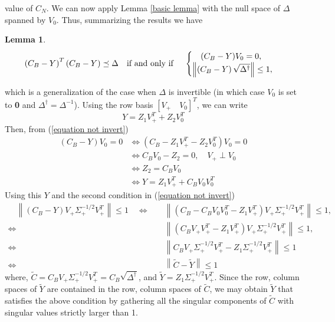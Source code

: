 \documentclass[11pt]{article}
\newtheorem{lemma}[theorem]{Lemma}
\renewcommand{\math}[1]{$#1$}
\newcommand{\norm}[1]{\left\|#1\right\|}
\newcommand{\Leq}{\preceq}
\begin{document}
value of \math{C_N}.
We can now apply Lemma \ref{basic lemma} with the null space of 
$\Delta$ spanned by $V_0$. Thus, summarizing the results we have
\begin{lemma}\label{combined}
\begin{eqnarray}\label{equation not invert}
\left( {C}_B - {Y} \right)^T \left( {C}_B - {Y} \right) \Leq \Delta 
\text{\quad if and only if \quad }
\begin{cases}
\quad (C_B - Y)V_0 = 0, \\
\norm{\left( {C}_B - {Y} \right) \sqrt{\Delta^{\dagger}} } \leq 1,
\end{cases}
\end{eqnarray}
\end{lemma}
\noindent which is a generalization of the case when \math{\Delta} is invertible (in which case \math{V_0} is set to \textbf{0} and \math{\Delta^\dagger=\Delta^{-1}}).
Using the row basis  $[V_+ \quad V_0]^T$, we can write
\[Y = Z_1V_+^T + Z_2V_0^T\]
Then, from (\ref{equation not invert})
\begin{align*}
(C_B - Y)V_0 = 0 & \iff (C_B - Z_1V_+^T - Z_2V_0^T)V_0 = 0\\
& \iff C_BV_0 - Z_2 = 0, \quad V_+ \perp V_0\\
& \iff Z_2 = C_BV_0\\
& \iff Y = Z_1V_+^T + C_BV_0V_0^T
\end{align*}
Using this $Y$ and the second condition in (\ref{equation not invert})
\begin{align*}
\quad \norm{\left( {C}_B - {Y} \right) V_+ {\Sigma}^{-1/2}_+V_+^T } \leq 1 \quad \iff & \quad \norm{\left( {C}_B - C_BV_0V_0^T - Z_1V_+^T \right) V_+ {\Sigma}^{-1/2}_+V_+^T } \leq 1,\\
\iff & \quad \norm{\left(C_BV_+V_+^T - Z_1V_+^T \right) V_+ {\Sigma}^{-1/2}_+V_+^T } \leq 1,\\
\iff & \quad \norm{C_BV_+{\Sigma}^{-1/2}_+V_+^T  - Z_1{\Sigma}^{-1/2}_+V_+^T } \leq 1\\
\iff & \quad \norm{\tilde{C} - \tilde{Y}} \leq 1
\end{align*}
where, \quad $\tilde{C} = C_BV_+{\Sigma}^{-1/2}_+V_+^T = C_B \sqrt{\Delta^{\dagger}}$, \quad and \quad $\tilde{Y} = Z_1{\Sigma}^{-1/2}_+V_+^T$.
Since the row, column spaces of $\tilde Y$ are contained in the row, column spaces of $\tilde C$, we may obtain $\tilde{Y}$ that satisfies the above condition by gathering all the singular components of $\tilde{C}$ with singular values strictly larger than 1. 
\end{document}
